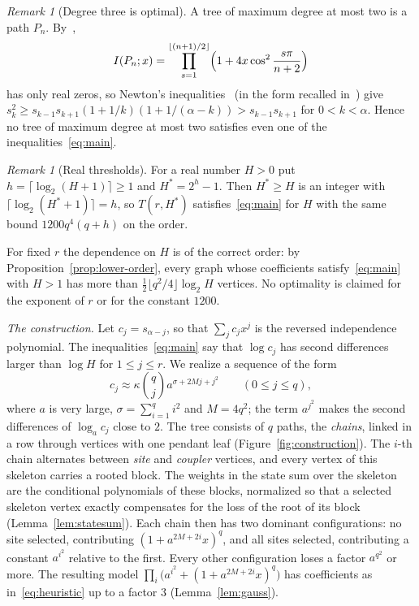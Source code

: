 \documentclass[11pt]{amsart}
\theoremstyle{definition}
\theoremstyle{remark}
\newtheorem{remark}[theorem]{Remark}
\numberwithin{equation}{section}
\begin{document}
\begin{remark}[Degree three is optimal]\label{rem:degree}
A tree of maximum degree at most two is a path $P_n$. By~\cite[(2.3)]{WZ},
\[
I(P_n;x)=\prod_{s=1}^{\lfloor(n+1)/2\rfloor}\Bigl(1+4x\cos^2\frac{s\pi}{n+2}\Bigr)
\]
has only real zeros, so Newton's inequalities~\cite[p.~104]{HLP} (in the form recalled in~\cite[Section~1]{WZ}) give $s_k^2\ge s_{k-1}s_{k+1}(1+1/k)(1+1/(\alpha-k))>s_{k-1}s_{k+1}$ for $0<k<\alpha$. Hence no tree of maximum degree at most two satisfies even one of the inequalities~\eqref{eq:main}.
\end{remark}

\begin{remark}[Real thresholds]\label{rem:real}
For a real number $H>0$ put $h=\lceil\log_2(H+1)\rceil\ge1$ and $H^*=2^h-1$. Then $H^*\ge H$ is an integer with $\lceil\log_2(H^*+1)\rceil=h$, so $T(r,H^*)$ satisfies~\eqref{eq:main} for $H$ with the same bound $1200q^4(q+h)$ on the order.
\end{remark}

For fixed $r$ the dependence on $H$ is of the correct order: by Proposition~\ref{prop:lower-order}, every graph whose coefficients satisfy~\eqref{eq:main} with $H>1$ has more than $\tfrac12\lfloor q^2/4\rfloor\log_2H$ vertices. No optimality is claimed for the exponent of $r$ or for the constant $1200$.

\smallskip
\noindent\emph{The construction.} Let $c_j=s_{\alpha-j}$, so that $\sum_j c_jx^j$ is the reversed independence polynomial. The inequalities~\eqref{eq:main} say that $\log c_j$ has second differences larger than $\log H$ for $1\le j\le r$. We realize a sequence of the form
\begin{equation}\label{eq:heuristic}
c_j\approx \kappa\binom{q}{j}a^{\sigma+2Mj+j^2}\qquad(0\le j\le q),
\end{equation}
where $a$ is very large, $\sigma=\sum_{i=1}^q i^2$ and $M=4q^2$; the term $a^{j^2}$ makes the second differences of $\log_ac_j$ close to $2$. The tree consists of $q$ paths, the \emph{chains}, linked in a row through vertices with one pendant leaf (Figure~\ref{fig:construction}). The $i$-th chain alternates between \emph{site} and \emph{coupler} vertices, and every vertex of this skeleton carries a rooted block. The weights in the state sum over the skeleton are the conditional polynomials of these blocks, normalized so that a selected skeleton vertex exactly compensates for the loss of the root of its block (Lemma~\ref{lem:statesum}). Each chain then has two dominant configurations: no site selected, contributing $(1+a^{2M+2i}x)^q$, and all sites selected, contributing a constant $a^{i^2}$ relative to the first. Every other configuration loses a factor $a^{q^2}$ or more. The resulting model $\prod_i\bigl(a^{i^2}+(1+a^{2M+2i}x)^q\bigr)$ has coefficients as in~\eqref{eq:heuristic} up to a factor $3$ (Lemma~\ref{lem:gauss}).
\end{document}
